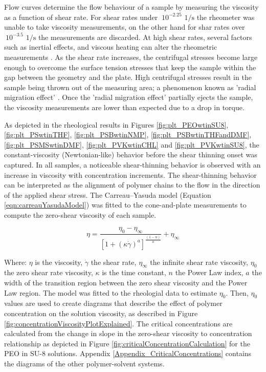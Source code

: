 Flow curves determine the flow behaviour of a sample by measuring the viscosity as a function of shear rate. For shear rates under $~10^{-2.25} \textrm{ 1} / \textrm{s}$ the rheometer was unable to take viscosity measurements, on the other hand for shar rates over $~10^{-3.5} \textrm{ 1} / \textrm{s}$ the measurements are discarded. At high shear rates, several factors such as inertial effects, and viscous heating can alter the rheometric measurements \cite{RByron1987, Macosko1994}. As the shear rate increases, the centrifugal stresses become large enough to overcome the surface tension stresses that keep the sample within the gap between the geometry and the plate. High centrifugal stresses result in the sample being thrown out of the measuring area; a phenomenon known as 'radial migration effect' \cite{Connelly1985}. Once the 'radial migration effect' partially ejects the sample, the viscosity measurements are lower than expected due to a drop in torque. \cite{Pipe2008}

As depicted in the rheological results in Figures \ref{fig:plt_PEOwtinSU8}, \ref{fig:plt_PSwtinTHF}, \ref{fig:plt_PSBwtinNMP}, \ref{fig:plt_PSBwtinTHFandDMF}, \ref{fig:plt_PSMSwtinDMF}, \ref{fig:plt_PVKwtinCHL} and \ref{fig:plt_PVKwtinSU8}, the constant-viscosity (Newtonian-like) behavior before the shear thinning onset was captured. In all samples, a noticeable shear-thinning behavior is observed with an increase in viscosity with concentration increments. The shear-thinning behavior can be interpreted as the alignment of polymer chains to the flow in the direction of the applied shear stress. \cite{Floreshernandez2020} The Carreau–Yasuda model (Equation \ref{eqn:carreauYasudaModel}) \cite{RByron1987} was fitted to the cone-and-plate  measurements to compute the zero-shear viscosity of each sample.

\begin{equation}\label{eqn:carreauYasudaModel}
    \eta = \frac{\eta_0 - \eta_{\infty}}{\left[1 + \left(\kappa \dot{\gamma}\right)^a\right]^{\frac{(1 - n)}{a}}} + \eta_{\infty}
\end{equation}

Where: $\eta$ is the viscosity, $\dot{\gamma}$ the shear rate, $\eta_{\infty}$ the  infinite shear rate viscosity, $\eta_0$ the zero shear rate viscosity, $\kappa$ is the time constant, $n$ the Power Law index, $a$ the width of the transition region between the zero shear viscosity and the Power Law region. The model was fitted to the rheologial data to estimate $\eta_0$. Then, $\eta_0$ values are used to create diagrams that describe the effect of polymer concentration on the solution viscosity, as described in Figure \ref{fig:concentrationViscosityPlotExplained}. The critical concentrations are calculated from the change in slope in the zero-shear viscosity to concentration relationship as depicted in Figure \ref{fig:criticalConcentrationCalculation} for the PEO in SU-8 solutions. Appendix \ref{Appendix_CriticalConcentrations} contains the diagrams of the other polymer-solvent systems.


